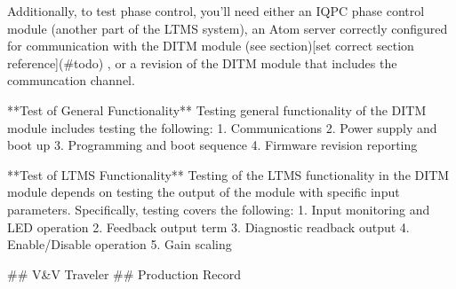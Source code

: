 \documentclass{article}
\begin{document}
Additionally, to test phase control, you'll need either an IQPC phase control module (another part of the LTMS system), an Atom server correctly configured for communication with the DITM module (see section)[set correct section reference](#todo) , or a revision of the DITM module that includes the communcation channel.

**Test of General Functionality**
Testing general functionality of the DITM module includes testing the following:
1. Communications
2. Power supply and boot up
3. Programming and boot sequence
4. Firmware revision reporting

**Test of LTMS Functionality**
Testing of the LTMS functionality in the DITM module depends on testing the output of the module with specific input parameters. Specifically, testing covers the following:
1. Input monitoring and LED operation
2. Feedback output term
3. Diagnostic readback output
4. Enable/Disable operation
5. Gain scaling

## V&V Traveler
## Production Record
\end{document}
